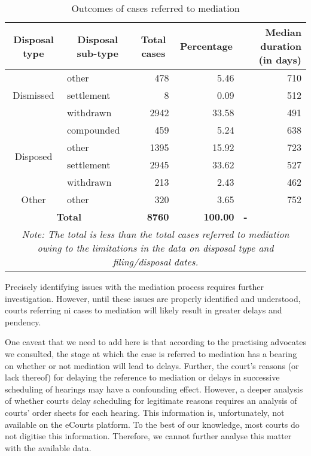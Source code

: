 {\footnotesize \begin{longtable}{@{}clrrr@{}}
 \caption{Outcomes of cases referred to mediation}
 \label{tab:mediation}\\
 \toprule
 \textbf{Disposal type} & \multicolumn{1}{c}{\textbf{Disposal sub-type}} & \multicolumn{1}{c}{\textbf{Total cases}} & \multicolumn{1}{c}{\textbf{Percentage}} & \multicolumn{1}{p{3cm}}{\textbf{Median duration (in days)}} \\
 \midrule \endhead
 \multirow{3}{*}{Dismissed} & other & 478 & 5.46 & 710 \\
 & settlement & 8 & 0.09 & 512 \\
 & withdrawn & 2942 & 33.58 & 491 \\
 \midrule
 \multirow{4}{*}{Disposed} & compounded & 459 & 5.24 & 638 \\
 & other & 1395 & 15.92 & 723 \\
 & settlement & 2945 & 33.62 & 527 \\
 & withdrawn & 213 & 2.43 & 462 \\
 \midrule
 Other & other & 320 & 3.65 & 752 \\
 \midrule
 \multicolumn{2}{c}{\textbf{Total}} & \textbf{8760} & \textbf{100.00} & \multicolumn{1}{l}{\textbf{-}} \\
 \bottomrule \multicolumn{5}{p{11cm}}{{\footnotesize \emph{Note:
 The total is less than the total cases referred to mediation owing to the limitations in the data on disposal type and filing/disposal dates.}}}
 \end{longtable}}

Precisely identifying issues with the mediation process requires further investigation. However, until these issues are properly identified and understood, courts referring \gls{ni} cases to mediation will likely result in greater delays and pendency.

One caveat that we need to add here is that according to the practising advocates we consulted, the stage at which the case is referred to mediation has a bearing on whether or not mediation will lead to delays. Further, the court's reasons (or lack thereof) for delaying the reference to mediation or delays in successive scheduling of hearings may have a confounding effect. However, a deeper analysis of whether courts delay scheduling for legitimate reasons requires an analysis of courts' order sheets for each hearing. This information is, unfortunately, not available on the eCourts platform. To the best of our knowledge, most courts do not digitise this information. Therefore, we cannot further analyse this matter with the available data.

